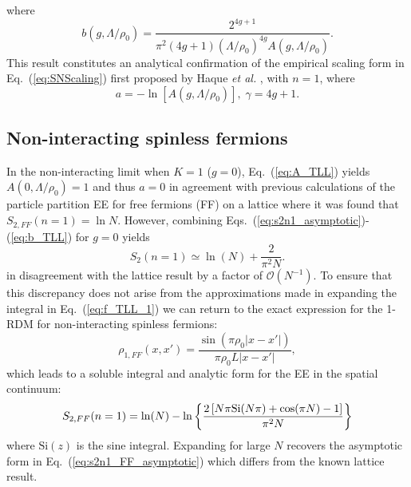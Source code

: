 %
where
% 
\begin{equation}
b(g,\Lambda/\rho_0)=\frac{2^{4 g+1}}{\pi ^2 (4 g+1)(\Lambda/\rho_0)^{4g}
A(g,\Lambda/\rho_0)}.
\label{eq:b_TLL} 
\end{equation}
%
This result constitutes an analytical confirmation of the empirical scaling
form in Eq.~(\ref{eq:SNScaling}) first proposed by Haque \emph{et al.}
\cite{Zozulya:2008kb,Haque:2009df}, with $n=1$, where  
%
\begin{equation}
a=-\ln\left[A(g,\Lambda/\rho_0)\right],\; \gamma=4g+1.
\label{eq:TLL_a1_gamma}
\end{equation}
%

\subsection{Non-interacting spinless fermions}

In the non-interacting limit when $K=1$ ($g=0$), Eq.~(\ref{eq:A_TLL}) yields
$A(0,\Lambda/\rho_0)=1$ and thus $a=0$ in agreement with previous calculations
of the particle partition EE for free fermions (FF) on a lattice
\cite{Zozulya:2008kb} where it was found that \\ $S_{2,{FF}}(n=1) = \ln N$.
However, combining Eqs.~(\ref{eq:s2n1_asymptotic})-(\ref{eq:b_TLL}) for $g=0$
yields 
%
\begin{equation}
S_{2}(n=1)\simeq\ln(N)+\frac{2}{\pi^2N}.
\label{eq:s2n1_FF_asymptotic}
\end{equation}
%
in disagreement with the lattice result by a factor of $\mathcal{O}(N^{-1})$.  To
ensure that this discrepancy does not arise from the approximations made in
expanding the integral in Eq.~(\ref{eq:f_TLL_1}) we can return to the exact expression for the
1-RDM for non-interacting spinless fermions:
%
\begin{equation}
\rho_{1,FF}\left(x,x'\right)=\frac{\sin(\pi \rho_0|x-x'|)}{\pi \rho_0L|x-x'|},\label{eq:FFOBDM}
\end{equation}
%
which leads to a soluble integral and analytic form for the EE in the spatial
continuum:
%
\begin{equation}
    S_{2,FF}(n=1)=\ln(N)-\ln\left\{\frac{2 \left[N \pi {\rm{Si}}(N \pi )+\cos (\pi
    N)-1\right]}{\pi ^2 N}\right\}
\label{eq:s2n1_FF}
\end{equation}
%
where $\mathrm{Si}(z)$ is the sine integral.  Expanding for large $N$ recovers
the asymptotic form in Eq.~(\ref{eq:s2n1_FF_asymptotic}) which differs from the
known lattice result.

